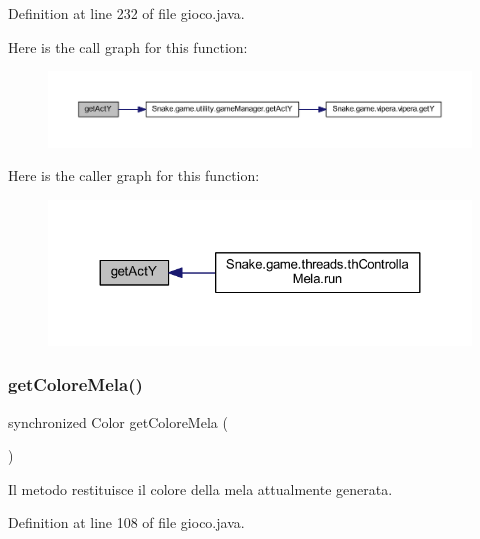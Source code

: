 Definition at line 232 of file gioco.\+java.

Here is the call graph for this function\+:
\nopagebreak
\begin{figure}[H]
\begin{center}
\leavevmode
\includegraphics[width=350pt]{class_snake_1_1game_1_1gioco_aedb81d58024c710a010bfa1c48f329f0_cgraph}
\end{center}
\end{figure}
Here is the caller graph for this function\+:
\nopagebreak
\begin{figure}[H]
\begin{center}
\leavevmode
\includegraphics[width=324pt]{class_snake_1_1game_1_1gioco_aedb81d58024c710a010bfa1c48f329f0_icgraph}
\end{center}
\end{figure}
\mbox{\label{class_snake_1_1game_1_1gioco_a054f84dfe4bbfc78f789a4dc4203794b}} 
\subsubsection{\texorpdfstring{get\+Colore\+Mela()}{getColoreMela()}}
{\footnotesize\ttfamily synchronized Color get\+Colore\+Mela (\begin{DoxyParamCaption}{ }\end{DoxyParamCaption})}



Il metodo restituisce il colore della mela attualmente generata. 



Definition at line 108 of file gioco.\+java.

